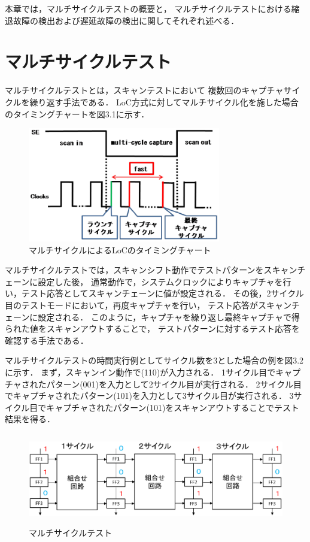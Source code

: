 本章では，マルチサイクルテストの概要と，
マルチサイクルテストにおける縮退故障の検出および遅延故障の検出に関してそれぞれ述べる．

\section{マルチサイクルテスト}
マルチサイクルテスト\cite{multicycle}とは，スキャンテストにおいて
複数回のキャプチャサイクルを繰り返す手法である．
LoC方式に対してマルチサイクル化を施した場合のタイミングチャートを図3.1に示す．

\begin{figure}[h]
	\begin{center}
		\includegraphics[height=50mm]{LoCmulti.eps}
		\caption{マルチサイクルによるLoCのタイミングチャート}
	\end{center}
\end{figure}

マルチサイクルテストでは，スキャンシフト動作でテストパターンをスキャンチェーンに設定した後，
通常動作で，システムクロックによりキャプチャを行い，テスト応答としてスキャンチェーンに値が設定される．
その後，2サイクル目のテストモードにおいて，再度キャプチャを行い，
テスト応答がスキャンチェーンに設定される．
このように，キャプチャを繰り返し最終キャプチャで得られた値をスキャンアウトすることで，
テストパターンに対するテスト応答を確認する手法である．

マルチサイクルテストの時間実行例としてサイクル数を3とした場合の例を図3.2に示す．
まず，スキャンイン動作で(110)が入力される．
1サイクル目でキャプチャされたパターン(001)を入力として2サイクル目が実行される．
2サイクル目でキャプチャされたパターン(101)を入力として3サイクル目が実行される．
3サイクル目でキャプチャされたパターン(101)をスキャンアウトすることでテスト結果を得る．

\begin{figure}[h]
	\begin{center}
		\includegraphics[height=40mm]{multicycle.eps}
		\caption{マルチサイクルテスト}
	\end{center}
\end{figure}	

